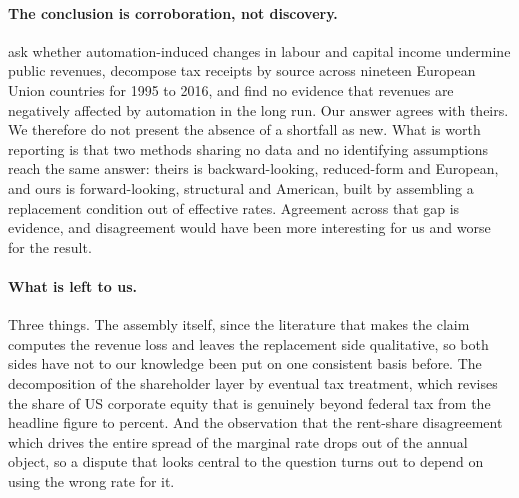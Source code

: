 \paragraph{The conclusion is corroboration, not discovery.}
\citet{HotteTheodorakopoulosKoutroumpis2024} ask whether automation-induced changes in labour
and capital income undermine public revenues, decompose tax receipts by source across nineteen
European Union countries for 1995 to 2016, and find no evidence that revenues are negatively
affected by automation in the long run. Our answer agrees with theirs. We therefore do not
present the absence of a shortfall as new. What is worth reporting is that two methods sharing
no data and no identifying assumptions reach the same answer: theirs is backward-looking,
reduced-form and European, and ours is forward-looking, structural and American, built by
assembling a replacement condition out of effective rates. Agreement across that gap is
evidence, and disagreement would have been more interesting for us and worse for the result.

\paragraph{What is left to us.} Three things. The assembly itself, since the literature that
makes the claim computes the revenue loss and leaves the replacement side qualitative, so both
sides have not to our knowledge been put on one consistent basis before. The decomposition of
the shareholder layer by eventual tax treatment, which revises the share of US corporate equity
that is genuinely beyond federal tax from the headline figure to 
percent. And the observation that the rent-share disagreement which drives the entire spread of
the marginal rate drops out of the annual object, so a dispute that looks central to the
question turns out to depend on using the wrong rate for it.
